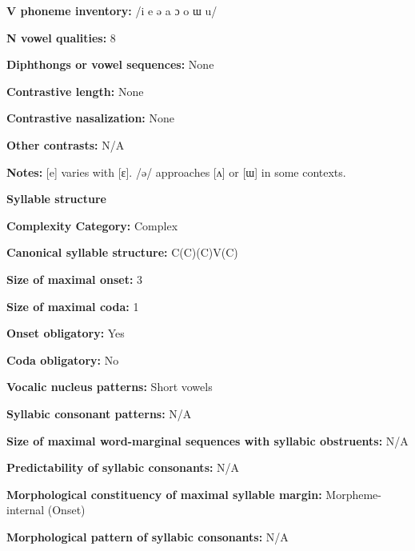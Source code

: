 \textbf{V phoneme inventory:} /i e ə a ɔ o ɯ u/



\textbf{N vowel qualities:} 8



\textbf{Diphthongs or vowel sequences:} None



\textbf{Contrastive length:} None



\textbf{Contrastive nasalization:} None



\textbf{Other contrasts:} N/A



\textbf{Notes:} [e] varies with [ɛ]. /ə/ approaches [ʌ] or [ɯ] in some contexts.



\textbf{Syllable structure}



\textbf{Complexity Category:} Complex



\textbf{Canonical syllable structure:} C(C)(C)V(C) \citep[30-32]{Plaisier2007}



\textbf{Size of maximal onset:} 3



\textbf{Size of maximal coda:} 1



\textbf{Onset obligatory:} Yes



\textbf{Coda obligatory:} No



\textbf{Vocalic nucleus patterns:} Short vowels



\textbf{Syllabic consonant patterns:} N/A



\textbf{Size of maximal word{}-marginal sequences with syllabic obstruents:} N/A



\textbf{Predictability of syllabic consonants:} N/A



\textbf{Morphological constituency of maximal syllable margin:} Morpheme-internal (Onset)



\textbf{Morphological pattern of syllabic consonants:} N/A



